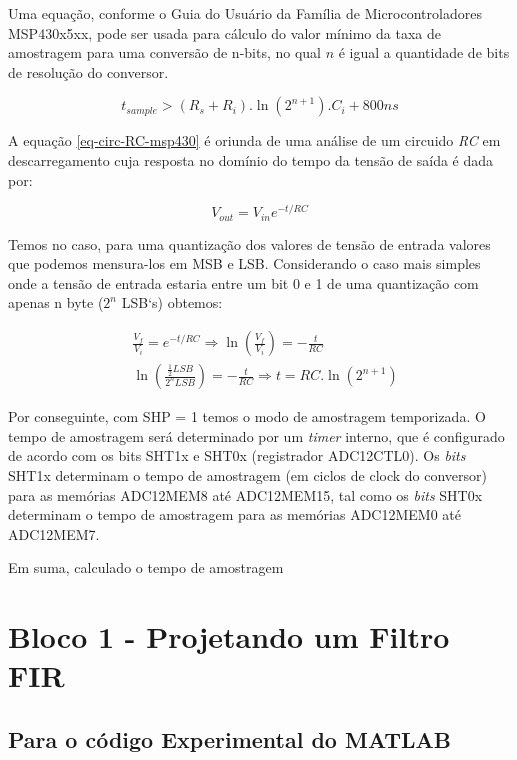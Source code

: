 			Uma equação, conforme o Guia do Usuário da Família de Microcontroladores MSP430x5xx, pode ser usada para cálculo do valor mínimo da taxa de amostragem para uma conversão de n-bits, no qual $ n $ é igual a quantidade de bits de resolução do conversor.
			
			\begin{equation}
				t_{sample} > (R_s + R_i) . \ln(2^{n+1}). C_i + 800ns
				\label{eq-circ-RC-msp430}
			\end{equation}
			
			A equação \ref{eq-circ-RC-msp430}  é oriunda de uma análise de um circuido \textit{RC} em descarregamento cuja resposta no domínio do tempo da tensão de saída é dada por:
			
			\begin{equation*}
				V_{out} = V_{in}e^{-t/{RC}}
			\end{equation*}
			
			Temos no caso, para uma quantização dos valores de tensão de entrada valores que podemos mensura-los em MSB e LSB. Considerando o caso mais simples onde a tensão de entrada estaria entre um bit 0 e 1 de uma quantização com apenas n byte ($ 2^n $ LSB`s) obtemos:
			
			\begin{equation}
				\begin{aligned}
						&\frac{V_f}{V_i} = e^{-t/{RC}}\Rightarrow \ln\left(\frac{V_f}{V_i}\right) = -\frac{t}{RC}\\
					&\ln\left(\frac{\frac{1}{2}LSB}{2^n LSB}\right) = -\frac{t}{RC}\Rightarrow \boxed{t = RC.\ln(2^{n+1})}
				\end{aligned}
			\end{equation}

			
			Por conseguinte, com SHP = 1 temos o modo de amostragem temporizada. O tempo de amostragem será determinado por um \textit{timer} interno, que é configurado de acordo com os bits SHT1x e SHT0x (registrador ADC12CTL0). Os \textit{bits} SHT1x determinam o tempo de amostragem (em ciclos de clock do conversor) para as memórias ADC12MEM8 até ADC12MEM15, tal como os \textit{bits} SHT0x determinam o tempo de amostragem para as memórias ADC12MEM0 até ADC12MEM7.
			
			Em suma, calculado o tempo de amostragem 
			
\section{Bloco 1 - Projetando um Filtro FIR}
	\subsection{Para o código Experimental do MATLAB}
		
